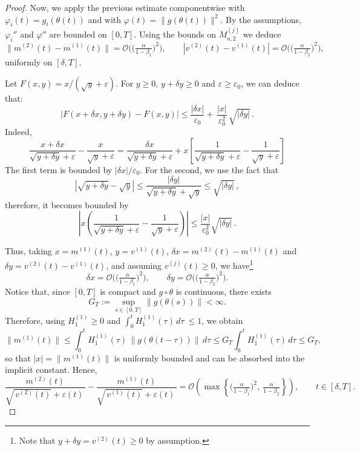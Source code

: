 \documentclass[10pt,a4paper]{amsart}
\begin{document}
\begin{proof}
Now, we apply the previous estimate componentwise with $\varphi_i(t)=g_i(\theta(t))$ and with $\varphi(t)=\|g(\theta(t))\|^2$. By the assumptions, $\varphi_i''$ and $\varphi''$ are bounded on $[0,T]$. Using the bounds on $M^{(j)}_{a,2}$ we deduce
\[
\|m^{(2)}(t)-m^{(1)}(t)\|
=
\mathcal O\!\Big(\Big(\tfrac{\alpha}{1-\beta_1}\Big)^{\!2}\Big),
\qquad
|v^{(2)}(t)-v^{(1)}(t)|
=
\mathcal O\!\Big(\Big(\tfrac{\alpha}{1-\beta_2}\Big)^{\!2}\Big),
\]
uniformly on $[\delta,T]$.

Let $F(x,y)=x/(\sqrt{y}+\varepsilon)$. For $y\ge 0$, $y+\delta y \geq 0$ and $\varepsilon\ge\varepsilon_0$, we can deduce that:
\[
|F(x+\delta x,y+\delta y)-F(x,y)|
\le
\frac{|\delta x|}{\varepsilon_0}
+
\,\frac{|x|}{\varepsilon_0^2}\,\sqrt{|\delta y|}\,.
\]
Indeed,
\[
\frac{x+\delta x}{\sqrt{y+\delta y}+\varepsilon}-\frac{x}{\sqrt{y}+\varepsilon}
=\frac{\delta x}{\sqrt{y+\delta y}+\varepsilon} + x\left[\frac{1}{\sqrt{y+\delta y} + \varepsilon} - \frac{1}{\sqrt{y}+\varepsilon} \right]
\]
The first term is bounded by $|\delta x|/\varepsilon_0$. For the second, we use the fact that
\[
|\sqrt{y+\delta y}-\sqrt{y}| \leq \frac{|\delta y|}{\sqrt{y+\delta y} + \sqrt{y}}\leq \sqrt{|\delta y|}\,,
\]
therefore, it becomes bounded by
\[
\left|x\!\left(\frac{1}{\sqrt{y+\delta y}+\varepsilon}-\frac{1}{\sqrt{y}+\varepsilon}\right)\right| \leq \frac{|x|}{\varepsilon^2_0} \sqrt{|\delta y|}\,.
\]

Thus, taking $x=m^{(1)}(t)$, $y=v^{(1)}(t)$, $\delta x=m^{(2)}(t)-m^{(1)}(t)$ and $\delta y=v^{(2)}(t)-v^{(1)}(t)$, and assuming $v^{(j)}(t)\ge0$, we have\footnote{Note that $y+\delta y=v^{(2)}(t)\ge 0$ by assumption.}
\[
\delta x=\mathcal{O}\!\Big(\Big(\tfrac{\alpha}{1-\beta_1}\Big)^{\!2}\Big),\qquad
\delta y=\mathcal{O}\!\Big(\Big(\tfrac{\alpha}{1-\beta_2}\Big)^{\!2}\Big).
\]
Notice that, since $[0,T]$ is compact and $g\circ\theta$ is continuous, there exists
\[
G_T:=\sup_{s\in[0,T]}\|g(\theta(s))\|<\infty.
\]
Therefore, using $H^{(1)}_1\ge 0$ and $\int_0^t H^{(1)}_1(\tau)\,d\tau\ \leq 1$, we obtain
\[
\|m^{(1)}(t)\|
\le \int_0^t H^{(1)}_1(\tau)\,\|g(\theta(t-\tau))\|\,d\tau
\le G_T\int_0^t H^{(1)}_1(\tau)\,d\tau
\leq G_T,
\]
so that $|x|=\|m^{(1)}(t)\|$ is uniformly bounded and can be absorbed into the implicit constant. Hence,
\begin{equation}\label{eq:diff_moments_order}
  \frac{m^{(2)}(t)}{\sqrt{\,v^{(2)}(t)}+\varepsilon(t)\,}
-\frac{m^{(1)}(t)}{\sqrt{\,v^{(1)}(t)}+\varepsilon(t)\,}
=
\mathcal{O}\!\left(\max\left\{\Big(\tfrac{\alpha}{1-\beta_1}\Big)^2,\ \tfrac{\alpha}{1-\beta_2}\right\}\right), \qquad t\in[\delta, T].
\end{equation}



\end{proof}
\end{document}

